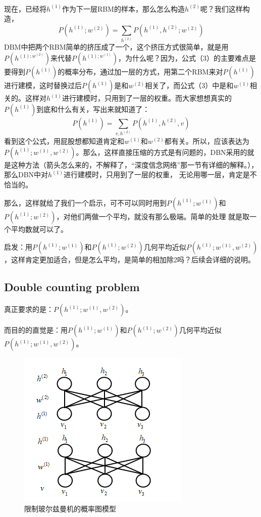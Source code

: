 \documentclass[a4paper]{article}
\begin{document}
~\\

现在，已经将$h^{(1)}$作为下一层RBM的样本，那么怎么构造$h^{(2)}$呢？我们这样构造，
$$
P(h^{(1)};w^{(2)}) = \sum_{h^{(2)}}P(h^{(1)},h^{(2)};w^{(2)})
$$
DBM中把两个RBM简单的挤压成了一个，这个挤压方式很简单，就是用$P(h^{(1);w^{(2)}})$来代替$P(h^{(1);w^{(1)}})$，为什么呢？因为，公式（3）的主要难点是要得到$P(h^{(1)})$的概率分布，通过加一层的方式，用第二个RBM来对$P(h^{(1)})$进行建模，这时替换过后$P(h^{(1)})$是和$w^{(2)}$相关了，而公式（3）中是和$w^{(1)}$相关的。这样对$h^{(1)}$进行建模时，只用到了一层的权重。而大家想想真实的$P(h^{(1)})$到底和什么有关，写出来就知道了：
$$
P(h^{(1)}) = \sum_{v,h^{(2)}} P(h^{(1)},h^{(2)},v)
$$
看到这个公式，用屁股想都知道肯定和$w^{(1)}$和$w^{(2)}$都有关。所以，应该表达为$P(h^{(1)};w^{(1)},w^{(2)})$。那么，这样直接压缩的方式是有问题的，DBN采用的就是这种方法（箭头怎么来的，不解释了，“深度信念网络”那一节有详细的解释。），那么DBN中对$h^{(1)}$进行建模时，只用到了一层的权重，
无论用哪一层，肯定是不恰当的。

那么，这样就给了我们一个启示，可不可以同时用到$P(h^{(1)};w^{(1)})$和$P(h^{(1)};w^{(2)})$，对他们两做一个平均，就没有那么极端。简单的处理 就是取一个平均数就可以了。

{\color{red}启发：用$P(h^{(1)};w^{(1)})$和$P(h^{(1)};w^{(2)})$几何平均近似$P(h^{(1)};w^{(1)},w^{(2)})$，这样肯定更加适合，但是怎么平均，是简单的相加除2吗？后续会详细的说明。}

\subsection{Double counting problem}
真正要求的是：$P(h^{(1)};w^{(1)},w^{(2)})$。

而目的的直觉是：用$P(h^{(1)};w^{(1)})$和$P(h^{(1)};w^{(2)})$几何平均近似$P(h^{(1)};w^{(1)},w^{(2)})$。

\begin{figure}[H]
    \centering
    \includegraphics[width=.4\textwidth]{微信图片_20200523155106.png}
    \caption{限制玻尔兹曼机的概率图模型}
    \label{fig:my_label_1}
\end{figure}
\end{document}
